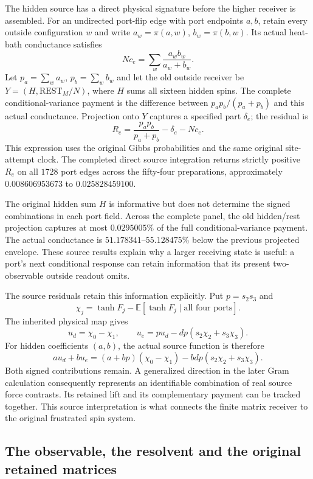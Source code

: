 The hidden source has a direct physical signature before the higher receiver is assembled. For an undirected port-flip edge with port endpoints $a,b$, retain every outside configuration $w$ and write $a_w=\pi(a,w)$, $b_w=\pi(b,w)$. Its actual heat-bath conductance satisfies
\[
 Nc_e=\sum_w\frac{a_wb_w}{a_w+b_w}.
\]
Let $p_a=\sum_w a_w$, $p_b=\sum_w b_w$ and let the old outside receiver be $Y=(H,\mathrm{REST}_M/N)$, where $H$ sums all sixteen hidden spins. The complete conditional-variance payment is the difference between $p_ap_b/(p_a+p_b)$ and this actual conductance. Projection onto $Y$ captures a specified part $\delta_e$; the residual is
\[
 R_e=\frac{p_ap_b}{p_a+p_b}-\delta_e-Nc_e.
\]
This expression uses the original Gibbs probabilities and the same original site-attempt clock. The completed direct source integration returns strictly positive $R_e$ on all $1728$ port edges across the fifty-four preparations, approximately $0.008606953673$ to $0.025828459100$. 

The original hidden sum $H$ is informative but does not determine the signed combinations in each port field. Across the complete panel, the old hidden/rest projection captures at most $0.0295005\%$ of the full conditional-variance payment. The actual conductance is $51.178341$--$55.128475\%$ below the previous projected envelope. These source results explain why a larger receiving state is useful: a port's next conditional response can retain information that its present two-observable outside readout omits.

The source residuals retain this information explicitly. Put $p=s_2s_3$ and
\[
 \chi_j=\tanh F_j-\mathbb E[\tanh F_j\mid\text{all four ports}].
\]
The inherited physical map gives
\[
 u_d=\chi_0-\chi_1,\qquad
 u_e=p u_d-dp(s_2\chi_2+s_3\chi_3).
\]
For hidden coefficients $(a,b)$, the actual source function is therefore
\[
 au_d+bu_e=(a+bp)(\chi_0-\chi_1)
                         -bdp(s_2\chi_2+s_3\chi_3).
\]
Both signed contributions remain. A generalized direction in the later Gram calculation consequently represents an identifiable combination of real source force contrasts. Its retained lift and its complementary payment can be tracked together. This source interpretation is what connects the finite matrix receiver to the original frustrated spin system.

\subsection{The observable, the resolvent and the original retained matrices}

